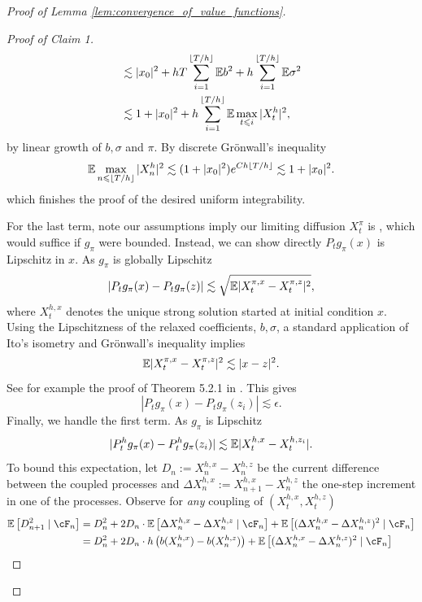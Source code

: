 \begin{proof}[Proof of Lemma \ref{lem:convergence_of_value_functions}]
\begin{proof}[Proof of Claim 1]
\begin{align*}
			& \lesssim |x_0|^2 + h T \sum_{i=1}^{\lfloor T/h \rfloor} \mathbb{E} b^2 + h\sum_{i=1}^{\lfloor T/h \rfloor} \mathbb{E} \sigma^2 \\
			& \lesssim 1 + |x_0|^2 + h\sum_{i=1}^{\lfloor T/h \rfloor} \mathbb{E}  \max_{t \leqslant i} |X^h_t|^2,
		\end{align*}
		\noindent by linear growth of $b, \sigma$ and $\pi$. By discrete Gr\"onwall's inequality
		\[\mathbb{E}\max_{n \leqslant \lfloor T/ h\rfloor} |X_n^h|^2 \lesssim (1+|x_0|^2)e^{Ch \lfloor T/h \rfloor} \lesssim 1 + |x_0|^2. \]
		\noindent which finishes the proof of the desired uniform integrability.

		 For the last term, note our assumptions imply our limiting diffusion $X^\pi_t$ is , which would suffice if $g_\pi$ were bounded.
		 Instead, we can show directly $P_tg_\pi(x)$ is Lipschitz in $x$. As $g_\pi$ is globally Lipschitz
		\[|P_t g_\pi(x) - P_t g_\pi(z)| \lesssim \sqrt{\mathbb{E} |X^{\pi, x}_t - X^{\pi, z}_t|^2}, \]
		\noindent where $X^{h,x}_t$ denotes the unique strong solution started at initial condition $x$. Using the Lipschitzness of the relaxed coefficients, $b, \sigma$, a standard application of Ito's isometry and Gr\"onwall's inequality implies
		\[\mathbb{E} |X^{\pi, x}_t - X^{\pi, z}_t|^2 \lesssim |x-z|^2.\]
		\noindent See for example the proof of Theorem 5.2.1 in \cite{oksendal2003_stochastic_differential_equations}.  This gives
		\[|P_t g_\pi(x) - P_t g_\pi(z_i)| \lesssim \epsilon.\]
		Finally, we handle the first term. As $g_\pi$ is Lipschitz
		\[|P_t^h g_\pi(x) - P_t^h g_\pi(z_i)| \lesssim \mathbb{E}| X^{h,x}_t -  X^{h, z_i}_t|.\]
		\noindent To bound this expectation, let $D_n := X^{h,x}_n -  X^{h, z}_n$ be the current difference between the coupled processes and $\Delta X^{h,x}_n := X^{h,x}_{n+1} - X^{h,z}_n$ the one-step
		increment in one of the processes. Observe for \textit{any} coupling of $(X_t^{h,x}, X_t^{h,z})$
		\begin{align*}
			\E \left[D_{n+1}^2 \mid \cF_n\right] & = D_n^2 + 2 D_n \cdot \E\left[\Delta X^{h,x}_n - \Delta X^{h,z}_n \mid \cF_n\right] + \E\left[(\Delta X^{h,x}_n - \Delta X^{h,z}_n)^2 \mid \cF_n\right] \\
			& = D_n^2 + 2 D_n \cdot h\left(b(X^{h,x}_n) - b(X^{h,z}_n)\right) + \E\left[(\Delta X^{h,x}_n - \Delta X^{h,z}_n)^2 \mid \cF_n\right]
		\end{align*}


\end{proof}
\end{proof}
